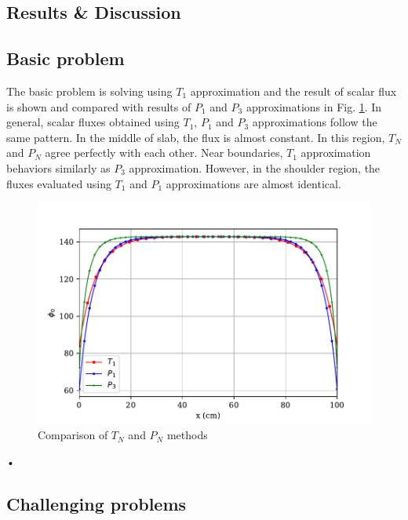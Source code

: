 \documentclass[11pt]{article}
\begin{document}
\begin{spacing}{1.5}
\section{Results \& Discussion}
\subsection{Basic problem}
The basic problem is solving using $T_1$ approximation and the result of scalar flux is shown and compared with results of $P_1$ and $P_3$ approximations in Fig. \ref{fig:basic}. In general, scalar fluxes obtained using $T_1$, $P_1$ and $P_3$ approximations follow the same pattern. In the middle of slab, the flux is almost constant. In this region, $T_N$ and $P_N$ agree perfectly with each other. Near boundaries, $T_1$ approximation behaviors similarly as $P_3$ approximation. However, in the shoulder region, the fluxes evaluated using $T_1$ and $P_1$ approximations are almost identical. 
\begin{figure}[htbp]
\centering
\includegraphics{TP_comp_2.pdf}
\caption{Comparison of $T_N$ and $P_N$ methods}\label{fig:basic}
\end{figure}•
\subsection{Challenging problems}

\end{spacing}
\end{document}
